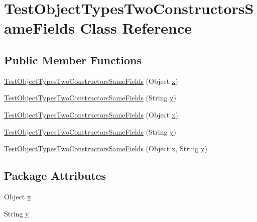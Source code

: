 \hypertarget{classTestObjectTypesTwoConstructorsSameFields}{
\section{TestObjectTypesTwoConstructorsSameFields Class Reference}
\label{classTestObjectTypesTwoConstructorsSameFields}
}
\subsection*{Public Member Functions}
\begin{DoxyCompactItemize}
\item 
\hyperlink{classTestObjectTypesTwoConstructorsSameFields_a6dc87aae21c011b25284aae5a19ee7f7}{TestObjectTypesTwoConstructorsSameFields} (Object \hyperlink{classTestObjectTypesTwoConstructorsSameFields_a04f96fd0943c9a645a6449150136bca9}{x})
\item 
\hyperlink{classTestObjectTypesTwoConstructorsSameFields_a6430941970fbd4cf7b5cf283b8e6bcc3}{TestObjectTypesTwoConstructorsSameFields} (String \hyperlink{classTestObjectTypesTwoConstructorsSameFields_a95a563961bd6f03151682f0d5f3abf7c}{y})
\item 
\hyperlink{classTestObjectTypesTwoConstructorsSameFields_a6dc87aae21c011b25284aae5a19ee7f7}{TestObjectTypesTwoConstructorsSameFields} (Object \hyperlink{classTestObjectTypesTwoConstructorsSameFields_a04f96fd0943c9a645a6449150136bca9}{x})
\item 
\hyperlink{classTestObjectTypesTwoConstructorsSameFields_a6430941970fbd4cf7b5cf283b8e6bcc3}{TestObjectTypesTwoConstructorsSameFields} (String \hyperlink{classTestObjectTypesTwoConstructorsSameFields_a95a563961bd6f03151682f0d5f3abf7c}{y})
\item 
\hyperlink{classTestObjectTypesTwoConstructorsSameFields_abfae3e56414acc0ec42a9de30bdd42e2}{TestObjectTypesTwoConstructorsSameFields} (Object \hyperlink{classTestObjectTypesTwoConstructorsSameFields_a04f96fd0943c9a645a6449150136bca9}{x}, String \hyperlink{classTestObjectTypesTwoConstructorsSameFields_a95a563961bd6f03151682f0d5f3abf7c}{y})
\end{DoxyCompactItemize}
\subsection*{Package Attributes}
\begin{DoxyCompactItemize}
\item 
Object \hyperlink{classTestObjectTypesTwoConstructorsSameFields_a04f96fd0943c9a645a6449150136bca9}{x}
\item 
String \hyperlink{classTestObjectTypesTwoConstructorsSameFields_a95a563961bd6f03151682f0d5f3abf7c}{y}
\end{DoxyCompactItemize}


